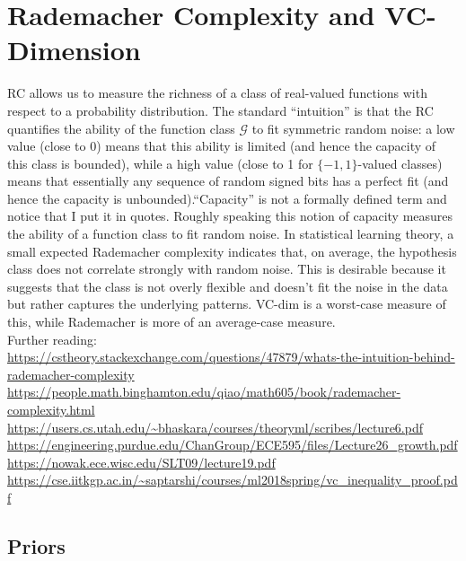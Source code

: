 \chapter{Rademacher Complexity and VC-Dimension}
\begin{flushleft}
	RC allows us to measure the richness of a class of real-valued
	functions with respect to a probability distribution. The standard
	``intuition'' is that the RC quantifies the ability of the
	function class $\mathcal{G}$ to fit symmetric random noise: a low value
	(close to 0) means
	that this ability is limited (and hence the capacity of this class is
	bounded), while a high value (close to 1 for $\{-1,1\}$-valued
	classes) means that essentially any sequence of random signed
	bits has a perfect fit (and hence the capacity is unbounded).``Capacity''
	is not a formally defined term and notice that I put it in quotes.
	Roughly
	speaking this notion of capacity measures the ability of a function
	class to fit random noise. In statistical learning theory, a small expected Rademacher complexity indicates that, on average,
	the hypothesis class does not correlate strongly with random noise. This is desirable because
	it suggests that the class is not overly flexible and doesn't fit the noise in the data but rather captures the underlying patterns.
	VC-dim is a worst-case measure of this, while Rademacher is more of an
	average-case measure.\\
	Further reading:\\

	\url{https://cstheory.stackexchange.com/questions/47879/whats-the-intuition-behind-rademacher-complexity}\\

	\url{https://people.math.binghamton.edu/qiao/math605/book/rademacher-complexity.html}\\

	\url{https://users.cs.utah.edu/~bhaskara/courses/theoryml/scribes/lecture6.pdf}\\

	\url{https://engineering.purdue.edu/ChanGroup/ECE595/files/Lecture26_growth.pdf}\\
	\url{https://nowak.ece.wisc.edu/SLT09/lecture19.pdf}\\

	\url{https://cse.iitkgp.ac.in/~saptarshi/courses/ml2018spring/vc_inequality_proof.pdf}\\

	\section{Priors}


\end{flushleft}
